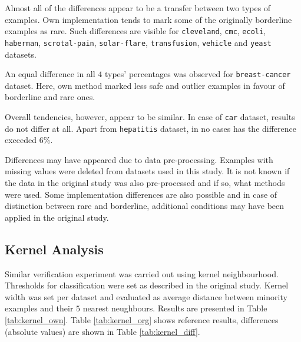 \documentclass[12pt]{article}
\begin{document}
Almost all of the differences appear to be a transfer between two types of examples. Own implementation tends to mark some of the originally borderline examples as rare. Such differences are visible for \texttt{cleveland}, \texttt{cmc}, \texttt{ecoli}, \texttt{haberman}, \texttt{scrotal-pain}, \texttt{solar-flare},  \texttt{transfusion}, \texttt{vehicle} and \texttt{yeast} datasets.

An equal difference in all $4$ types' percentages was observed for \texttt{breast-cancer} dataset. Here, own method marked less safe and outlier examples in favour of borderline and rare ones.

Overall tendencies, however, appear to be similar. In case of \texttt{car} dataset, results do not differ at all. Apart from \texttt{hepatitis} dataset, in no cases has the difference exceeded $6\%$. 

Differences may have appeared due to data pre-processing. Examples with missing values were deleted from datasets used in this study. It is not known if the data in the original study was also pre-processed and if so, what methods were used. Some implementation differences are also possible and in case of distinction between rare and borderline, additional conditions may have been applied in the original study.

\subsection{Kernel Analysis}

Similar verification experiment was carried out using kernel neighbourhood. Thresholds for classification were set as described in the original study. Kernel width was set per dataset and evaluated as average distance between minority examples and their $5$ nearest neughbours. Results are presented in Table \ref{tab:kernel_own}. Table \ref{tab:kernel_org} shows reference results, differences (absolute values) are shown in Table \ref{tab:kernel_diff}.
\end{document}
